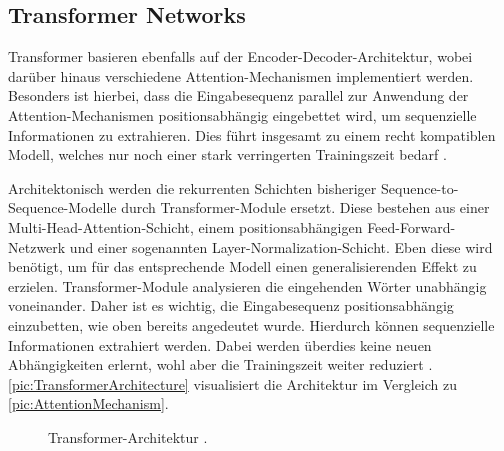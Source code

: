 \subsection{Transformer Networks}
\noindent
Transformer basieren ebenfalls auf der Encoder-Decoder-Architektur, wobei darüber hinaus verschiedene Attention-Mechanismen implementiert werden. Besonders ist hierbei, dass die Eingabesequenz parallel zur Anwendung der Attention-Mechanismen positionsabhängig eingebettet wird, um sequenzielle Informationen zu extrahieren. Dies führt insgesamt zu einem recht kompatiblen Modell, welches nur noch einer stark verringerten Trainingszeit bedarf \cite[S.~398]{ZHA20}.
\newpage

\noindent
Architektonisch werden die rekurrenten Schichten bisheriger Sequence-to-Sequence-Modelle durch Transformer-Module ersetzt. Diese bestehen aus einer Multi-Head-Attention-Schicht, einem positionsabhängigen Feed-Forward-Netzwerk und einer sogenannten Layer-Normalization-Schicht. Eben diese wird benötigt, um für das entsprechende Modell einen generalisierenden Effekt zu erzielen. Transformer-Module analysieren die eingehenden Wörter unabhängig voneinander. Daher ist es wichtig, die Eingabesequenz positionsabhängig einzubetten, wie oben bereits angedeutet wurde. Hierdurch können sequenzielle Informationen extrahiert werden. Dabei werden überdies keine neuen Abhängigkeiten erlernt, wohl aber die Trainingszeit weiter reduziert \cite[S.~399-404]{ZHA20}. \autoref{pic:TransformerArchitecture} visualisiert die Architektur im Vergleich zu \autoref{pic:AttentionMechanism}.\\

\begin{figure}[h!]
  \centering
  \caption{Transformer-Architektur \cite[S.~399]{ZHA20}.}
  \label{pic:TransformerArchitecture}
\end{figure}


